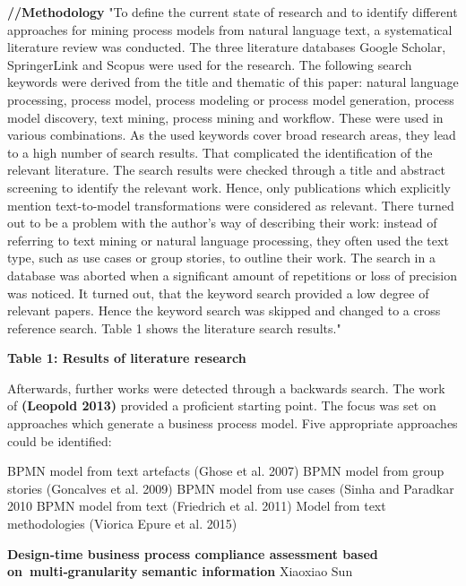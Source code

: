 \textbf{//Methodology}
"To define the current state of research and to identify different approaches for mining process models from natural language text, a systematical literature review was conducted. The three literature databases Google Scholar, SpringerLink and Scopus were used for the research. The following search keywords were derived from the title and thematic of this paper: natural language processing, process model, process modeling or process model generation, process model discovery, text mining, process mining and workflow. These were used in various combinations. As the used keywords cover broad research areas, they lead to a high number of search results. That complicated the identification of the relevant literature. The search results were checked through a title and abstract screening to identify the relevant work. Hence, only publications which explicitly mention text-to-model transformations were considered as relevant. There turned out to be a problem with the author’s way of describing their work: instead of referring to text mining or natural language processing, they often used the text type, such as use cases or group stories, to outline their work. The search in a database was aborted when a significant amount of repetitions or loss of precision was noticed. It turned out, that the keyword search provided a low degree of relevant papers. Hence the keyword search was skipped and changed to a cross reference search. Table 1 shows the literature search results."

\textbf{Table 1: Results of literature research}


Afterwards, further works were detected through a backwards search. The work of \textbf{(Leopold 2013)} provided a proficient starting point. The focus was set on approaches which generate a business process model. Five appropriate approaches could be identified:

BPMN model from text artefacts (Ghose et al. 2007) 
BPMN model from group stories (Goncalves et al. 2009) 
BPMN model from use cases (Sinha and Paradkar 2010
BPMN model from text (Friedrich et al. 2011) 
Model from text methodologies (Viorica Epure et al. 2015)

\textbf{Design‑time business process compliance assessment based on multi‑granularity semantic information }
Xiaoxiao Sun
\cite{sunDesigntimeBusinessProcess2023}

